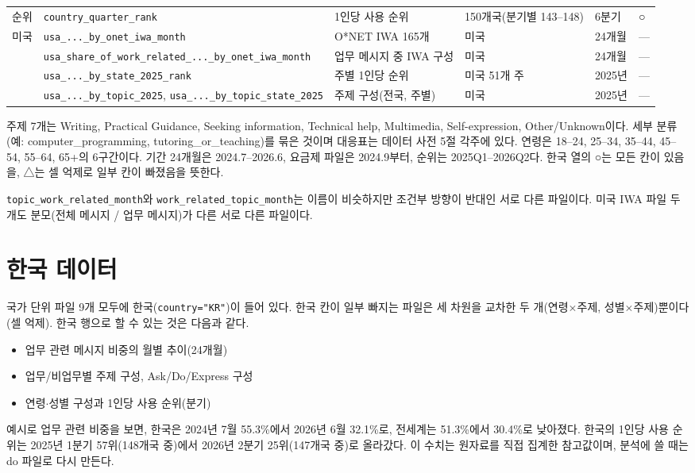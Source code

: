 \documentclass[11pt]{article}
\begin{document}
\begin{longtable}{L{1.8cm}L{4.4cm}L{3.0cm}L{2.2cm}L{1.9cm}L{1.3cm}}
순위 & \texttt{country\_quarter\_rank} & 1인당 사용 순위 & 150개국(분기별 143--148) & 6분기 & ○ \\
미국 & \texttt{usa\_...\_by\_onet\_iwa\_month} & O*NET IWA 165개 & 미국 & 24개월 & --- \\
 & \texttt{usa\_share\_of\_work\_related\_...\_by\_onet\_iwa\_month} & 업무 메시지 중 IWA 구성 & 미국 & 24개월 & --- \\
 & \texttt{usa\_...\_by\_state\_2025\_rank} & 주별 1인당 순위 & 미국 51개 주 & 2025년 & --- \\
 & \texttt{usa\_...\_by\_topic\_2025}, \texttt{usa\_...\_by\_topic\_state\_2025} & 주제 구성(전국, 주별) & 미국 & 2025년 & --- \\
\bottomrule
\end{longtable}

주제 7개는 Writing, Practical Guidance, Seeking information, Technical help, Multimedia, Self-expression, Other/Unknown이다. 세부 분류(예: computer\_programming, tutoring\_or\_teaching)를 묶은 것이며 대응표는 데이터 사전 5절 각주에 있다. 연령은 18--24, 25--34, 35--44, 45--54, 55--64, 65+의 6구간이다. 기간 24개월은 2024.7--2026.6, 요금제 파일은 2024.9부터, 순위는 2025Q1--2026Q2다. 한국 열의 ○는 모든 칸이 있음을, △는 셀 억제로 일부 칸이 빠졌음을 뜻한다.

\texttt{topic\_work\_related\_month}와 \texttt{work\_related\_topic\_month}는 이름이 비슷하지만 조건부 방향이 반대인 서로 다른 파일이다. 미국 IWA 파일 두 개도 분모(전체 메시지 / 업무 메시지)가 다른 서로 다른 파일이다.

\section{한국 데이터}

국가 단위 파일 9개 모두에 한국(\texttt{country="KR"})이 들어 있다. 한국 칸이 일부 빠지는 파일은 세 차원을 교차한 두 개(연령$\times$주제, 성별$\times$주제)뿐이다(셀 억제). 한국 행으로 할 수 있는 것은 다음과 같다.
\begin{itemize}
  \item 업무 관련 메시지 비중의 월별 추이(24개월)
  \item 업무/비업무별 주제 구성, Ask/Do/Express 구성
  \item 연령$\cdot$성별 구성과 1인당 사용 순위(분기)
\end{itemize}

예시로 업무 관련 비중을 보면, 한국은 2024년 7월 55.3\%에서 2026년 6월 32.1\%로, 전세계는 51.3\%에서 30.4\%로 낮아졌다. 한국의 1인당 사용 순위는 2025년 1분기 57위(148개국 중)에서 2026년 2분기 25위(147개국 중)로 올라갔다. 이 수치는 원자료를 직접 집계한 참고값이며, 분석에 쓸 때는 do 파일로 다시 만든다.
\end{document}
